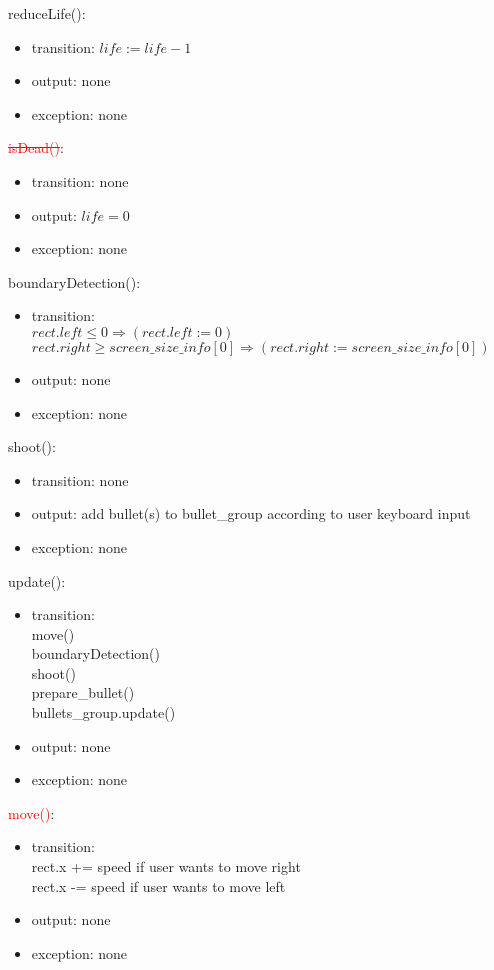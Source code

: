 \documentclass[12pt]{article}
\begin{document}
\noindent reduceLife():
\begin{itemize}
\item transition: $life := life - 1$
\item output: none
\item exception: none
\end{itemize}

\noindent \textcolor{red}{\st{isDead()}}:
\begin{itemize}
\item transition: none
\item output: $life = 0$
\item exception: none
\end{itemize}

\noindent boundaryDetection():
\begin{itemize}
\item transition: \\
$rect.left \leq 0 \Rightarrow (rect.left := 0)$\\
$rect.right \geq screen\_size\_info[0] \Rightarrow (rect.right := screen\_size\_info[0])$
\item output: none
\item exception: none
\end{itemize}

\noindent shoot():
\begin{itemize}
\item transition: none
\item output: add bullet(s) to bullet\_group according to user keyboard input
\item exception: none
\end{itemize}

\noindent update():
\begin{itemize}
\item transition: \\move()\\boundaryDetection()\\shoot()\\prepare\_bullet()\\bullets\_group.update()
\item output: none
\item exception: none
\end{itemize}


\noindent \textcolor{red}{move()}:
\begin{itemize}
\item transition: \\
rect.x += speed if user wants to move right\\
rect.x -= speed if user wants to move left
\item output: none
\item exception: none
\end{itemize}
\end{document}
